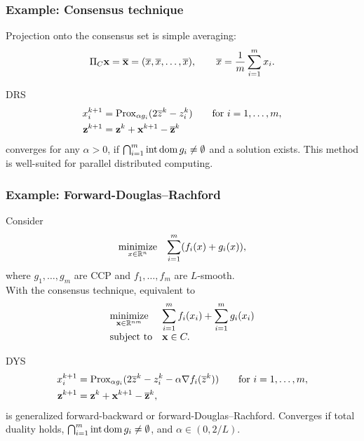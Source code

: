 \documentclass[10pt,mathserif]{beamer}
\begin{document}
\begin{frame}
\frametitle{Example: Consensus technique}
Projection onto the consensus set is simple averaging:
\[
\Pi_C {\mathbf{x}} =
\overline {{\mathbf{x}}}=
(\overline x,\overline x, \dots, \overline x), \qquad \overline x =
\frac{1}{m} \sum_{i=1}^m x_i.
\]
\vspace{0.2in}

DRS
\begin{align*}
x^{k+1}_i &=\mathrm{Prox}_{\alpha g_i}(
2\overline{z}^k-z^k_i)\qquad\text{for }i=1,\dots,m,\\
{\mathbf{z}}^{k+1} &= {\mathbf{z}}^k +  {\mathbf{x}}^{k+1}-\overline{{\mathbf{z}}}^k
\end{align*}
converges for any $\alpha>0$, if $\bigcap^m_{i=1}\mathrm{int}\,\mathrm{dom}\, g_i\ne \emptyset$ and a solution exists.
This method is well-suited for parallel distributed computing.
\end{frame}

\begin{frame}
\frametitle{Example: Forward-Douglas--Rachford}
Consider
\[
\begin{array}{ll}
\underset{x\in \mathbb{R}^n}{\mbox{minimize}} &
\displaystyle{\sum_{i=1}^m(f_i(x)+g_i(x))},
\end{array}
\]
where $g_1,\dots ,g_m$ are CCP and $f_1,\dots,f_m$ are $L$-smooth.\\
With the consensus technique, equivalent to
\[
\begin{array}{ll}
\underset{{\mathbf{x}}\in\mathbb{R}^{nm}}{\mbox{minimize}} &
\displaystyle{\sum^m_{i=1}f_i(x_i)
+
\sum_{i=1}^m g_i(x_i)}\\
\mbox{subject to} & {\mathbf{x}}\in C.
\end{array}
\]


\vspace{0.2in}


DYS
\begin{align*}
x^{k+1}_i &=\mathrm{Prox}_{\alpha g_i}(
2\overline{z}^k-z^k_i
-\alpha \nabla f_i(\overline{z}^k))\qquad\text{for }i=1,\dots,m,\\
{\mathbf{z}}^{k+1} &= {\mathbf{z}}^k +  {\mathbf{x}}^{k+1}-\overline{{\mathbf{z}}}^k,
\end{align*}
is generalized forward-backward or forward-Douglas--Rachford.
Converges if total duality holds,
 $\bigcap^m_{i=1}\mathrm{int}\,\mathrm{dom}\, g_i\ne \emptyset$, and $\alpha\in (0,2/L)$.
\end{frame}
\end{document}

